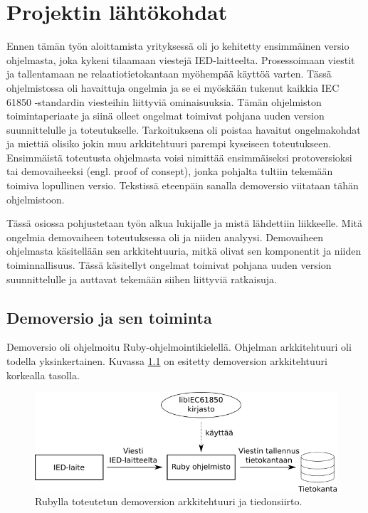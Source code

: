 \chapter{Projektin lähtökohdat}
\label{ch:projektin-lähtökohdat}
Ennen tämän työn aloittamista yrityksessä oli jo kehitetty ensimmäinen versio ohjelmasta, joka kykeni tilaamaan viestejä IED-laitteelta. Prosessoimaan viestit ja tallentamaan ne relaatiotietokantaan myöhempää käyttöä varten. Tässä ohjelmistossa oli havaittuja ongelmia ja se ei myöskään tukenut kaikkia IEC 61850 -standardin viesteihin liittyviä ominaisuuksia. Tämän ohjelmiston toimintaperiaate ja siinä olleet ongelmat toimivat pohjana uuden version suunnittelulle ja toteutukselle. Tarkoituksena oli poistaa havaitut ongelmakohdat ja miettiä olisiko jokin muu arkkitehtuuri parempi kyseiseen toteutukseen. Ensimmäistä toteutusta ohjelmasta voisi nimittää ensimmäiseksi protoversioksi tai demovaiheeksi (engl. proof of consept), jonka pohjalta tultiin tekemään toimiva lopullinen versio. Tekstissä eteenpäin sanalla demoversio viitataan tähän ohjelmistoon.

Tässä osiossa pohjustetaan työn alkua lukijalle ja mistä lähdettiin liikkeelle. Mitä ongelmia demovaiheen toteutuksessa oli ja niiden analyysi. Demovaiheen ohjelmasta käsitellään sen arkkitehtuuria, mitkä olivat sen komponentit ja niiden toiminnallisuus. Tässä käsitellyt ongelmat toimivat pohjana uuden version suunnittelulle ja auttavat tekemään siihen liittyviä ratkaisuja.


\section{Demoversio ja sen toiminta}
Demoversio oli ohjelmoitu Ruby-ohjelmointikielellä. Ohjelman arkkitehtuuri oli todella yksinkertainen. Kuvassa \ref{fig:demo-architecture} on esitetty demoversion arkkitehtuuri korkealla tasolla.

\begin{figure}
	\includegraphics[width=1\textwidth]{pictures/demo-architecture.png}
	\caption{Rubylla toteutetun demoversion arkkitehtuuri ja tiedonsiirto.}
	\label{fig:demo-architecture}
\end{figure}


